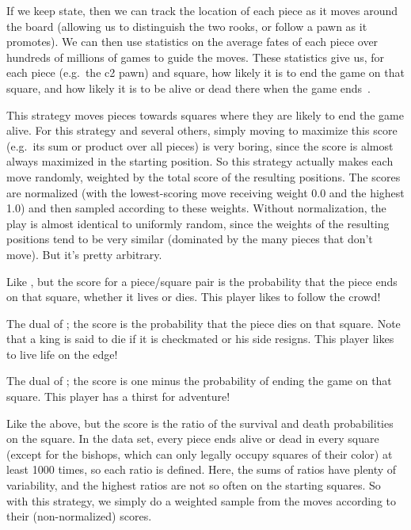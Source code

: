 \documentclass[10pt,preprint,twocolumn]{acmart}
\begin{document}
If we keep state, then we can track the location of each piece as it
moves around the board (allowing us to distinguish the two rooks, or
follow a pawn as it promotes). We can then use statistics on the
average fates of each piece over hundreds of millions of games to
guide the moves. These statistics give us, for each piece (e.g.~the c2
pawn) and square, how likely it is to end the game on that square, and
how likely it is to be alive or dead there when the game
ends~\cite{survival}.

 This strategy moves pieces towards squares where
they are likely to end the game alive. For this strategy and several
others, simply moving to maximize this score (e.g.~its sum or product
over all pieces) is very boring, since the score is almost always
maximized in the starting position. So this strategy actually makes
each move randomly, weighted by the total score of the resulting
positions. The scores are normalized (with the lowest-scoring move
receiving weight 0.0 and the highest 1.0) and then sampled according
to these weights. Without normalization, the play is almost identical
to uniformly random, since the weights of the resulting positions tend
to be very similar (dominated by the many pieces that don't move). But
it's pretty arbitrary.

 Like , but the score for a
piece/square pair is the probability that the piece ends on that
square, whether it lives or dies. This player likes to follow the
crowd!

 The dual of ; the score is the
probability that the piece dies on that square. Note that a king is
said to die if it is checkmated or his side resigns. This player likes
to live life on the edge!

 The dual of ; the score
is one minus the probability of ending the game on that square. This
player has a thirst for adventure!

 Like the above, but the score is the
ratio of the survival and death probabilities on the square. In the
data set, every piece ends alive or dead in every square (except
for the bishops, which can only legally occupy squares of their
color) at least 1000 times, so each ratio is defined. Here, the
sums of ratios have plenty of variability, and the highest
ratios are not so often on the starting squares. So with this
strategy, we simply do a weighted sample from the moves according
to their (non-normalized) scores.
\end{document}
